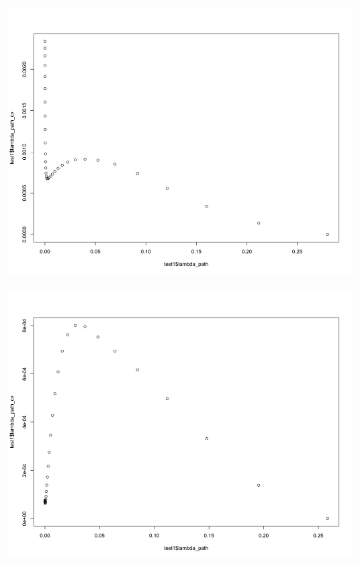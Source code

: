\documentclass[letterpaper]{article}
\begin{document}
\begin{figure}[H]
\centering
\begin{subfigure}{0.5\textwidth}
  \centering
  \includegraphics[width=1\linewidth]{./result_plot/cv_square/5wrong_path_plot}
\end{subfigure}%
\begin{subfigure}{.5\textwidth}
  \centering
  \includegraphics[width=1\linewidth]{./result_plot/cv_square/6wrong_path_plot}
\end{subfigure}

\end{figure}
\end{document}
